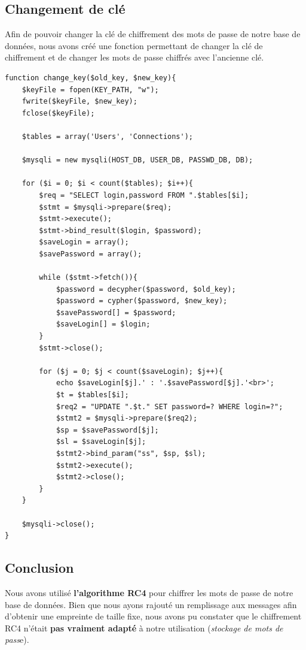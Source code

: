 \documentclass[12pt, a4paper]{article}
\begin{document}
\subsection{Changement de clé}

Afin de pouvoir changer la clé de chiffrement des mots de passe de notre base de données,
nous avons créé une fonction permettant de changer la clé de chiffrement
et de changer les mots de passe chiffrés avec l'ancienne clé.

\begin{lstlisting}[name=Fonction de changement de clé]
function change_key($old_key, $new_key){
    $keyFile = fopen(KEY_PATH, "w");
    fwrite($keyFile, $new_key);
    fclose($keyFile);

    $tables = array('Users', 'Connections');
    
    $mysqli = new mysqli(HOST_DB, USER_DB, PASSWD_DB, DB);

    for ($i = 0; $i < count($tables); $i++){
        $req = "SELECT login,password FROM ".$tables[$i];
        $stmt = $mysqli->prepare($req);
        $stmt->execute();
        $stmt->bind_result($login, $password);
        $saveLogin = array();
        $savePassword = array();

        while ($stmt->fetch()){
            $password = decypher($password, $old_key);
            $password = cypher($password, $new_key);
            $savePassword[] = $password;
            $saveLogin[] = $login;
        }
        $stmt->close();

        for ($j = 0; $j < count($saveLogin); $j++){
            echo $saveLogin[$j].' : '.$savePassword[$j].'<br>';
            $t = $tables[$i];
            $req2 = "UPDATE ".$t." SET password=? WHERE login=?";
            $stmt2 = $mysqli->prepare($req2);
            $sp = $savePassword[$j];
            $sl = $saveLogin[$j];
            $stmt2->bind_param("ss", $sp, $sl);
            $stmt2->execute();
            $stmt2->close();
        }
    }

    $mysqli->close();
}
\end{lstlisting}

\subsection*{Conclusion}

Nous avons utilisé \textbf{l'algorithme RC4} pour chiffrer les mots de passe de notre base de données.
Bien que nous ayons rajouté un remplissage aux messages afin d'obtenir une empreinte de taille fixe,
nous avons pu constater que le chiffrement RC4 n'était \textbf{pas vraiment adapté} à notre utilisation (\textit{stockage de mots de pass}e).
\end{document}
